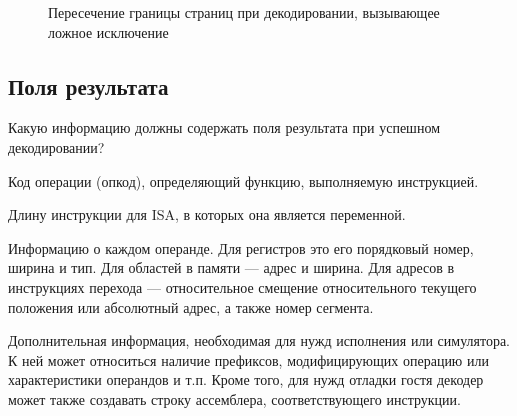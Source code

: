 \begin{figure}[htb]
    \centering
    \caption[Пересечение границы страниц при декодировании]{Пересечение границы страниц при декодировании, вызывающее ложное исключение}
    \label{fig:page-crossing-decode}
\end{figure}

\subsection{Поля результата}

Какую информацию должны содержать поля результата при успешном декодировании?

\begin{itemize*}
    \item Код операции (опкод), определяющий функцию, выполняемую инструкцией.
    \item Длину инструкции для ISA, в которых она является переменной.
    \item Информацию о каждом операнде. Для регистров это его порядковый номер, ширина и тип. Для областей в памяти --- адрес и ширина. Для адресов в инструкциях перехода --- относительное смещение относительного текущего положения или абсолютный адрес, а также номер сегмента.
    \item Дополнительная информация, необходимая для нужд исполнения или симулятора. К ней может относиться наличие префиксов, модифицирующих операцию или характеристики операндов и т.п. Кроме того, для нужд отладки гостя декодер может также создавать строку ассемблера, соответствующего инструкции.
\end{itemize*}

